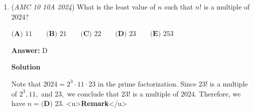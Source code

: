 \begin{enumerate}
 $\textbf{(A) }20\qquad\textbf{(B) }21\qquad\textbf{(C) }22\qquad\textbf{(D) }23\qquad\textbf{(E) }24$

 \textbf{Answer: }B



\textbf{Solution 1}

Since we want the least number of two-digit numbers, we maximize the two-digit numbers by choosing as many $99$s as possible. Since $2024=99\cdot20+44\cdot1,$ we choose twenty $99$s and one $44,$ for a total of $\boxed{\textbf{(B) }21}$ two-digit numbers.

 



\textbf{Solution 2}

We claim the answer is $21$. This can be achieved by adding twenty $99$'s and a $44$. To prove that the answer cannot be less than or equal to $20$, we note that the maximum value of the sum of $20$ or less two digit numbers is $20 \cdot 99 = 1980$, which is smaller than $2024$, so we are done. Thus, the answer is $\boxed{\textbf{(B) }21}$.

 



\textbf{Solution 3 (Same as Solution 1 but Using 100=99+1)}

$2024=100\cdot20+24$. Since $100=99+1$, $2024=(99+1)\cdot20+24=99\cdot20+1\cdot20+24=99\cdot20+44$. Therefore a total of $\boxed{\textbf{(B) }21}$ two-digit numbers are needed.

 



\textbf{Solution 4}

The maximum $2$-digit number is $99$, but try $100$. $2024 \div 100$ is a little more than $20$, and the remainder is less than $100$, by intuition, so there's $20 +$ the remainder $1 = \boxed{\textbf{(B) }21}$.

 


	\item (\textit{AMC 10 10A 2024}) What is the least value of $n$ such that $n!$ is a multiple of $2024$?


 $\textbf{(A) } 11\qquad\textbf{(B) } 21\qquad\textbf{(C) } 22\qquad\textbf{(D) } 23\qquad\textbf{(E) } 253$

 \textbf{Answer: }D



\textbf{Solution}

Note that $2024=2^3\cdot11\cdot23$ in the prime factorization. Since $23!$ is a multiple of $2^3, 11,$ and $23,$ we conclude that $23!$ is a multiple of $2024.$ Therefore, we have $n=\boxed{\textbf{(D) } 23}.$
<u>\textbf{Remark}</u>


\end{enumerate}
